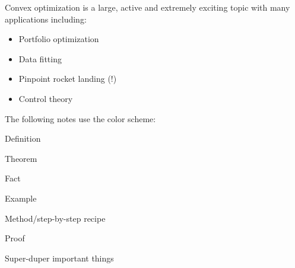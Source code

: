 
Convex optimization is a large, active and extremely exciting topic with many applications including:

\begin{itemize}
\item Portfolio optimization
\item Data fitting
\item Pinpoint rocket landing (!)
\item Control theory
\end{itemize}


The following notes use the color scheme:

\begin{Definition}
Definition
\end{Definition}
\begin{Theorem}
Theorem
\end{Theorem}
\begin{Fact}
Fact
\end{Fact}
\begin{Example}
Example
\end{Example}
\begin{Method}
Method/step-by-step recipe
\end{Method}
\begin{Proof}
Proof
\end{Proof}
\begin{VeryImportantStuff}
Super-duper important things
\end{VeryImportantStuff}